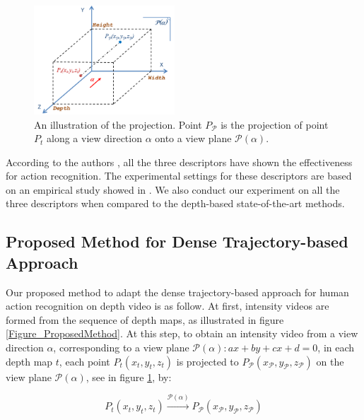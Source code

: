 \documentclass[final,3p,times,twocolumn]{elsarticle}
\begin{document}
\begin{figure}
	\centering
	\includegraphics[width=0.47\textwidth]{Figure_PointProjection.pdf} %
	\caption{\label{lbl:Figure_PointProjection}An illustration of the projection. Point $P_\mathcal{P}$ is the projection of point $P_t$ along a view direction $\alpha$ onto a view plane $\mathcal{P}(\alpha)$.}
\end{figure}

According to the authors \cite{laptev2008learning, wang2011densetraj, wang2009evaluation, liu2009recognizing}, all the three descriptors have shown the effectiveness for action recognition. The experimental settings for these descriptors are based on an empirical study showed in \cite{wang2011densetraj}. We also conduct our experiment on all the three descriptors when compared to the depth-based state-of-the-art methods.

\subsection{Proposed Method for Dense Trajectory-based Approach}

Our proposed method to adapt the dense trajectory-based approach for human action recognition on depth video is as follow. At first, intensity videos are formed from the sequence of depth maps, as illustrated in figure \ref{Figure_ProposedMethod}. At this step, to obtain an intensity video from a view direction $\alpha$, corresponding to a view plane $\mathcal{P}(\alpha): ax + by + cx + d = 0$, in each depth map $t$, each point $P_t(x_t,y_t,z_t)$ is projected to $P_\mathcal{P}(x_\mathcal{P},y_\mathcal{P},z_\mathcal{P})$ on the view plane $\mathcal{P}(\alpha)$, see in figure \ref{lbl:Figure_PointProjection}, by:

\begin{equation}
	P_t(x_t,y_t,z_t)\xrightarrow{\mathcal{P}(\alpha)}P_\mathcal{P}(x_\mathcal{P},y_\mathcal{P},z_\mathcal{P})
\end{equation}
\end{document}
